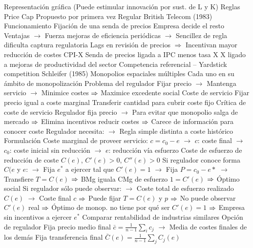\documentclass{nuevotema}
\begin{document}
\begin{esquemal}
				\4[] Representación gráfica
				\4[] 
				\4[] (Puede estimular innovación por sust. de L y K)
			\3 Reglas Price Cap
				\4 Propuesto por primera vez
				\4[] Regular British Telecom (1983)
				\4 Funcionamiento
				\4[] Fijación de una senda de precios
				\4[] Empresa decide el resto
				\4 Ventajas
				\4[] $\to$ Fuerza mejoras de eficiencia periódicas
				\4[] $\to$ Sencillez de regla dificulta captura regulatoria
				\4 Lags en revisión de precios
				\4[] $\Rightarrow$ Incentivan mayor reducción de costes
				\4 CPI-X
				\4[] Senda de precios ligada a IPC menos tasa X
				\4[] X ligado a mejoras de productividad del sector
			\3 Competencia referencial -- Yardstick competition
				\4 Schleifer (1985)
				\4 Monopolios espaciales múltiples
				\4[] Cada uno en su ámbito de monopolización
				\4 Problema del regulador
				\4[] Fijar precio
				\4[] $\to$ Mantenga servicio
				\4[] $\to$ Minimice costes
				\4[] $\Rightarrow$ Maximice excedente social
				\4 Coste de servicio
				\4[] Fijar precio igual a coste marginal
				\4[] Transferir cantidad para cubrir coste fijo
				\4 Crítica de coste de servicio
				\4[] Regulador fija precio
				\4[] $\to$ Para evitar que monopolio salga de mercado
				\4[] $\Rightarrow$ Elimina incentivos reducir costes
				\4[] $\Rightarrow$ Carece de información para conocer coste
				\4[] Regulador necesita:
				\4[] $\to$ Regla simple distinta a coste histórico
				\4 Formulación
				\4[] Coste marginal de proveer servicio:
				\4[] $c = c_0 - e$
				\4[] $\to$ $c$: coste final
				\4[] $\to$ $c_0$: coste inicial sin reducción
				\4[] $\to$ $e$: reducción vía esfuerzo
				\4[] Coste de esfuerzo de reducción de coste
				\4[] $C(e)$, $C'(e) > 0$, $C''(e) >0$
				\4[] Si regulador conoce forma $C(e$ y $e$:
				\4[] $\to$ Fija $e^*$ a ejercer tal que $C'(e) = 1$
				\4[] $\to$ Fija $P= c_0 - e*$
				\4[] $\to$ Transfiere $T=C(e)$
				\4[] $\Rightarrow$ BMg iguala CMg de esfuerzo $1=C'(e)$
				\4[] $\Rightarrow$ Óptimo social
				\4[] Si regulador sólo puede observar:
				\4[] $\to$ Coste total de esfuerzo realizado $C(e)$
				\4[] $\to$ Coste final $c$
				\4[] $\Rightarrow$ Puede fijar $T=C(e)$ y $p$
				\4[] $\Rightarrow$ No puede observar $C'(e)$ real
				\4[] $\Rightarrow$ Óptimo de monop. no tiene por qué ser $C'(e) = 1$
				\4[] $\Rightarrow$ Empresa sin incentivos a ejercer $e^*$
				\4 Comparar rentabilidad de industrias similares
				\4[] Opción de regulador
				\4[] Fija precio medio final $\bar{c} = \frac{1}{n-1} \sum_i c_j$
				\4[] $\to$ Media de costes finales de los demás
				\4[] Fija transferencia final $\bar{C}(e) = \frac{1}{n-1} \sum_j C_j(e)$

\end{esquemal}
\end{document}

